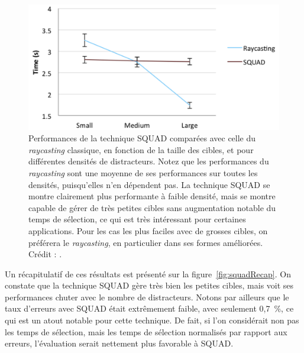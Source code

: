 	\begin{figure}[ht]
		\centering
		\includegraphics[width=\textwidth]{figures/ch2/squadSize}
		\caption[SQUAD --- Résultats : récapitulatif]{Performances de la technique SQUAD comparées avec celle du \emph{raycasting} classique, en fonction de la taille des cibles, et pour différentes densités de distracteurs. Notez que les performances du \emph{raycasting} sont une moyenne de ses performances sur toutes les densités, puisqu'elles n'en dépendent pas. La technique SQUAD se montre clairement plus performante à faible densité, mais se montre capable de gérer de très petites cibles sans augmentation notable du temps de sélection, ce qui est très intéressant pour certaines applications. Pour les cas les plus faciles avec de grosses cibles, on préférera le \emph{raycasting}, en particulier dans ses formes améliorées. Crédit : \cite{kopper2011rapid}.}
		\label{fig:squadSize}
	\end{figure}
	
	Un récapitulatif de ces résultats est présenté sur la figure~\ref{fig:squadRecap}. On constate que la technique SQUAD gère très bien les petites cibles, mais voit ses performances chuter avec le nombre de distracteurs. Notons par ailleurs que le taux d'erreurs avec SQUAD était extrêmement faible, avec seulement 0,7~\%{}, ce qui est un atout notable pour cette technique. De fait, si l'on considérait non pas les temps de sélection, mais les temps de sélection normalisés par rapport aux erreurs, l'évaluation serait nettement plus favorable à SQUAD.
	

